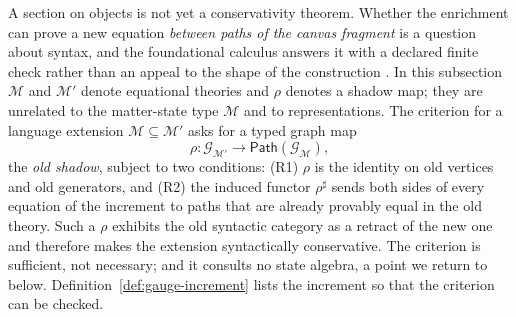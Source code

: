 A section on objects is not yet a conservativity theorem.  Whether the
enrichment can prove a new equation \emph{between paths of the canvas
fragment} is a question about syntax, and the foundational calculus answers
it with a declared finite check rather than an appeal to the shape of the
construction \cite{ArtC}.  In this subsection $\mathcal M$ and $\mathcal M'$
denote equational theories and $\rho$ denotes a shadow map; they are
unrelated to the matter-state type $\mathcal M$ and to representations.  The
criterion for a language extension
$\mathcal M\subseteq\mathcal M'$ asks for a typed graph map
\[
 \rho:\mathcal G_{\mathcal M'}\longrightarrow
      \mathsf{Path}(\mathcal G_{\mathcal M}),
\]
the \emph{old shadow}, subject to two conditions: \textup{(R1)} $\rho$ is the
identity on old vertices and old generators, and \textup{(R2)} the induced
functor $\rho^\sharp$ sends both sides of every equation of the increment to
paths that are already provably equal in the old theory.  Such a $\rho$
exhibits the old syntactic category as a retract of the new one and therefore
makes the extension syntactically conservative.  The criterion is sufficient,
not necessary; and it consults no state algebra, a point we return to below.
Definition~\ref{def:gauge-increment} lists the increment so that the
criterion can be checked.

